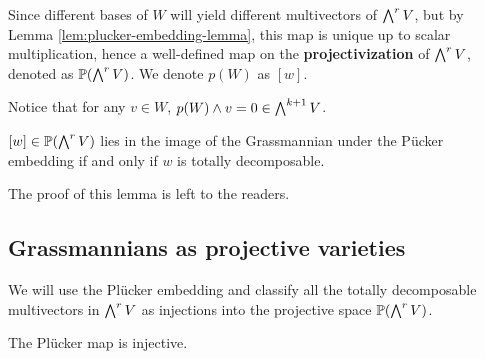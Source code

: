         \begin{remark}
        \label{rem:plucker-embedding}
            Since different bases of $W$ will yield different multivectors of $\bigwedge^r V$,
            but by Lemma \ref{lem:plucker-embedding-lemma},
            this map is unique up to scalar multiplication,
            hence a well-defined map on the \textbf{projectivization} of $\bigwedge^r V$, 
            denoted as $\mathbb{P}(\bigwedge^r V)$.
            We denote $p(W)$ as $[w]$.
            
            Notice that for any $v \in W$, 
            $p(W) \wedge v = 0 \in \bigwedge^{k+1} V$.
        \end{remark}
        
        \begin{lemma}
        \label{lem:grassmannian-image-totally-decomposable}    
            $[w] \in \mathbb{P}(\bigwedge^r V)$ 
            lies in the image of the Grassmannian 
            under the P\"{u}cker embedding 
            if and only if $w$ is totally decomposable.
        \end{lemma}
        The proof of this lemma is left to the readers.
        

        
        \subsection{Grassmannians as projective varieties}
        \label{subsec:grassmannians-as-projective-varieties}
            We will use the Pl\"{u}cker embedding 
            and classify all the totally decomposable multivectors in $\bigwedge^r V$ 
            as injections into the projective space $\mathbb{P}(\bigwedge^r V)$. 
            
            \begin{theorem}
            \label{thm:plucker-map-is-injective}
                The Pl\"{u}cker map is injective. 
            \end{theorem}
            
